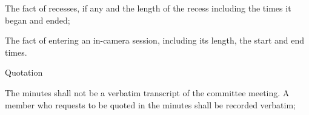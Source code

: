 \begin{longenum}[label*=\arabic*., align=left]
\begin{longenum}[label*=\arabic*., align=left]
\begin{longenum}[label*=\arabic*., align=left]
\begin{longenum}[label*=\arabic*., align=left]
		\item The fact of recesses, if any and the length of the recess including the times it began and ended;
		\item The fact of entering an in-camera session, including its length, the start and end times. 	
		\end{longenum} 	
		\end{longenum} 
		\end{longenum} 
	\begin{longenum}[resume, label*=\arabic*., align=left]
		\item Quotation		
		\begin{longenum}[label*=\arabic*., align=left]
		\item The minutes shall not be a verbatim transcript of the committee meeting.   A member who requests to be quoted in the minutes shall be recorded verbatim;
    	\end{longenum}
    	\end{longenum}
        \end{longenum} 



